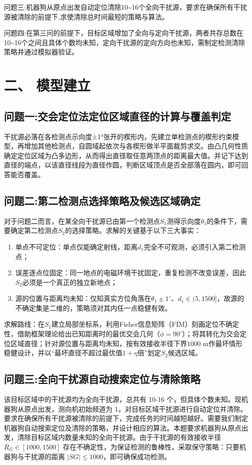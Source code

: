 \documentclass[UTF8, zihao=5,AutoFakeBold=2]{ctexart}
\begin{document}
		问题三:\quad 机器狗从原点出发自动定位清除10\textasciitilde16个全向干扰源，要求在确保所有干扰源被清除的前提下,求使清除总时间最短的策略与算法。
		
		问题四:\quad 在第三问的前提下，目标区域增加了全向与定向干扰源，两者共存总数在10\textasciitilde16个之间且具体个数均未知，定向干扰源的定向方向也未知，需制定检测清除策略并通过模拟器验证。

\section*{二、 模型建立}
	\subsection*{问题一:交会定位法定位区域直径的计算与覆盖判定}
	干扰源必落在各检测点示向度±1°张开的楔形内，先建立单检测点的楔形约束模型，再增加其他检测点，自圆域起依次与各楔形做半平面裁剪求交。由凸几何性质确定定位区域为凸多边形，从而得出直径取任意两顶点的距离最大值。并记下达到直径的端点，以该直径线段为直径作圆，判断区域顶点是否全部落在圆内，即可回答能否覆盖。
    
	\subsection*{问题二:第二检测点选择策略及候选区域确定}
	对于问题二而言，在某全向干扰源已由第一个检测点\(S_1\)测得示向度\(\theta_1\)的条件下，需要确定第二检测点\(S_2\)的选择策略。求解的关键基于以下三大事实：
    \begin{enumerate}[label=(\arabic*)]
        \item 单点不可定位：单点仅能确定射线，距离\(d_1\)完全不可观测，必须引入第二检测点；
        \item 误差逐点位固定：同一地点的电磁环境干扰固定，重复检测不改变误差，因此\(S_2\)必须是一个真正的独立新地点；
        \item 源的位置与距离均未知：仅知真实方位角落在\(\theta_1\pm1^\circ\)、\(d_1\in(5,1500]\)，故源的不确定集是二维的，策略须对其内任一点稳健有效。
    \end{enumerate}
    求解路线：在\(S_1\)建立局部坐标系，利用Fisher信息矩阵（FIM）刻画定位不确定性，借助框架理论给出已知距离时的最优交会几何（\(\phi=90^\circ\)）；将其转化为交会定位区域直径；针对源位置与距离均未知，按有效接收半径下界\(1000\) m作最坏情形稳健设计，并以“最坏直径不超过最优值\(1+\eta\)倍”划定\(S_2\)候选区域。
    
	\subsection*{问题三:全向干扰源自动搜索定位与清除策略}
	该目标区域中的干扰源均为全向干扰源，总共有 10-16 个，但具体个数未知。现机器狗从原点出发，测向机初始频道为 1，对目标区域干扰源进行自动定位并清除。要求在确保所有干扰源被清除的前提下，完成任务的时间越短越好。需要我们制定机器狗自动搜索定位及清除的策略，并设计相应的算法。本题要求机器狗从原点出发，清除目标区域内数量未知的全向干扰源。由于干扰源的有效接收半径 \(R_G \in [1000,1500]\) 存在不确定性，为保证检测的鲁棒性，采取保守策略：只要机器狗与干扰源的距离 \(|SG| \le 1000\)，即可确保成功检测。
\end{document}
